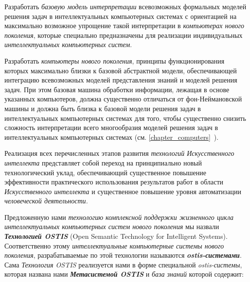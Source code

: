 \begin{textitemize}
\begin{textitemize}
\begin{textitemize}
		\end{textitemize}
	\end{textitemize}
	\item 
	Разработать \textit{базовую модель интерпретации} всевозможных формальных моделей решения задач в интеллектуальных компьютерных системах с ориентацией на максимально возможное упрощение такой интерпретации в \textit{компьютерах нового поколения}, которые специально предназначены для реализации индивидуальных \textit{интеллектуальных компьютерных систем}.
	\item 
	Разработать \textit{компьютеры нового поколения}, принципы функционирования которых максимально близки к базовой абстрактной модели, обеспечивающей интеграцию всевозможных моделей представления знаний и моделей решения задач. При этом базовая машина обработки информации, лежащая в основе указанных компьютеров, должна существенно отличаться от фон-Неймановской машины и должна быть близка к базовой модели решения задач в интеллектуальных компьютерных системах для того, чтобы существенно снизить сложность интерпретации всего многообразия моделей решения задач в интеллектуальных компьютерных системах (см. \ref{chapter_computers}~).
\end{textitemize}

Реализация всех перечисленных этапов развития \textit{технологий Искусственного интеллекта} представляет собой переход на принципиально новый технологический уклад, обеспечивающий существенное повышение эффективности практического использования результатов работ в области \textit{Искусственного интеллекта} и существенное повышение уровня автоматизации \textit{человеческой деятельности.}

Предложенную нами \textit{технологию комплексной поддержки жизненного цикла интеллектуальных компьютерных систем нового поколения} мы назвали \textbf{\textit{Технологией OSTIS}} (Open Semantic Technology for Intelligent Systems). Соответственно этому \textit{интеллектуальные компьютерные системы нового поколения}, разрабатываемые по этой технологии называются \textbf{\textit{ostis-системами}}. Сама \textit{Технология OSTIS} реализуется нами в форме специальной \textit{ostis-системы}, которая названа нами \textbf{\textit{Метасистемой OSTIS}} и \textit{база знаний} которой содержит:

